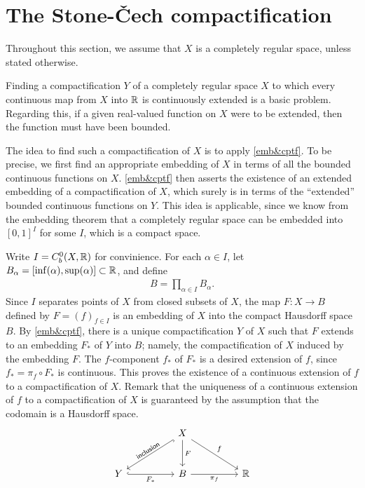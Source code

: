 \section{The Stone-\v{C}ech compactification}

Throughout this section, we assume that $X$ is a completely regular space, unless stated otherwise.

Finding a compactification $Y$ of a completely regular space $X$ to which every continuous map from $X$ into ${\mathbb{R}}$ is continuously extended is a basic problem.
Regarding this, if a given real-valued function on $X$ were to be extended, then the function must have been bounded.

The idea to find such a compactification of $X$ is to apply \cref{emb&cptf}.
To be precise, we first find an appropriate embedding of $X$ in terms of all the bounded continuous functions on $X$.
\cref{emb&cptf} then asserts the existence of an extended embedding of a compactification of $X$, which surely is in terms of the ``extended'' bounded continuous functions on $Y$.
This idea is applicable, since we know from the embedding theorem that a completely regular space can be embedded into $[0, 1]^I$ for some $I$, which is a compact space.

Write $I=C_b^0(X, {\mathbb{R}})$ for convinience.
For each $\alpha\in I$, let $B_\alpha=[\inf(\alpha), \sup(\alpha)]\subset{\mathbb{R}}$, and define
\begin{align*}
    B=\prod_{\alpha\in I}B_\alpha.
\end{align*}
Since $I$ separates points of $X$ from closed subsets of $X$, the map $F: X\rightarrow B$ defined by $F=(f)_{f\in I}$ is an embedding of $X$ into the compact Hausdorff space $B$.
By \cref{emb&cptf}, there is a unique compactification $Y$ of $X$ such that $F$ extends to an embedding $F_*$ of $Y$ into $B$; namely, the compactification of $X$ induced by the embedding $F$.
The $f$-component $f_*$ of $F_*$ is a desired extension of $f$, since $f_*=\pi_f\circ F_*$ is continuous.
This proves the existence of a continuous extension of $f$ to a compactification of $X$.
Remark that the uniqueness of a continuous extension of $f$ to a compactification of $X$ is guaranteed by the assumption that the codomain is a Hausdorff space.
\begin{equation*}
\begin{tikzcd}[row sep=large, column sep=huge]
    &
    X
    \arrow[dl, "\textsf{inclusion}"{sloped}, hook]
    \arrow[d, "F"]
    \arrow[dr, "f"]
    &
    \\
    Y
    \arrow[r, "F_*"', hook]
    &
    B
    \arrow[r, "\pi_f"']
    &
    \bb{R}
\end{tikzcd}
\end{equation*}

